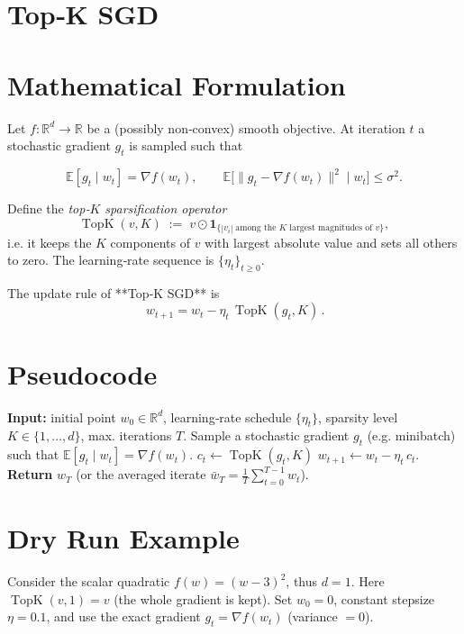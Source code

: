 \documentclass{article}
\newcommand{\TopK}[2]{\operatorname{TopK}\!\left(#1,#2\right)}
\newcommand{\E}{\mathbb{E}}
\newcommand{\R}{\mathbb{R}}
\begin{document}
\section*{Top‑K SGD}

\section*{Mathematical Formulation}
Let $f:\R^{d}\rightarrow\R$ be a (possibly non‑convex) smooth objective.  
At iteration $t$ a stochastic gradient $g_{t}$ is sampled such that  

\[
\E[g_{t}\mid w_{t}]=\nabla f(w_{t}) ,\qquad 
\E\!\big[\|g_{t}-\nabla f(w_{t})\|^{2}\mid w_{t}\big]\le \sigma^{2}.
\]

Define the \emph{top‑$K$ sparsification operator}
\[
\TopK{v}{K}\;:=\;v\odot \mathbf{1}_{\{|v_{i}|\;\text{among the $K$ largest magnitudes of }v\}},
\]
i.e. it keeps the $K$ components of $v$ with largest absolute value and sets all others to zero.  
The learning‑rate sequence is $\{\eta_{t}\}_{t\ge0}$.

The update rule of **Top‑K SGD** is
\[
\boxed{\,w_{t+1}=w_{t}-\eta_{t}\,\TopK{g_{t}}{K}\,}. \tag{1}
\]

\section*{Pseudocode}
\begin{algorithm}[H]
\caption{Top‑K SGD}
\begin{algorithmic}[1]
\State \textbf{Input:} initial point $w_{0}\in\R^{d}$, learning‑rate schedule $\{\eta_{t}\}$, sparsity level $K\in\{1,\dots,d\}$, max. iterations $T$.
    \State Sample a stochastic gradient $g_{t}$ (e.g. minibatch) such that $\E[g_{t}\mid w_{t}]=\nabla f(w_{t})$.
    \State $c_{t}\gets \TopK{g_{t}}{K}$ \hfill{}
    \State $w_{t+1}\gets w_{t}-\eta_{t}\,c_{t}$.
\EndFor
\State \textbf{Return} $w_{T}$ (or the averaged iterate $\bar w_{T}= \frac1T\sum_{t=0}^{T-1}w_{t}$).
\end{algorithmic}
\end{algorithm}

\section*{Dry Run Example}
Consider the scalar quadratic $f(w)=(w-3)^{2}$, thus $d=1$.  
Here $\TopK{v}{1}=v$ (the whole gradient is kept).  
Set $w_{0}=0$, constant stepsize $\eta=0.1$, and use the exact gradient $g_{t}=\nabla f(w_{t})$ (variance $=0$).
\end{document}
